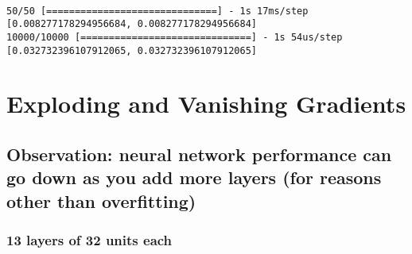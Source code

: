 \documentclass[11pt]{article}
\begin{document}
    \begin{center}
    \end{center}
    { \hspace*{\fill} \\}
    
    \begin{Verbatim}[commandchars=\\\{\}]
50/50 [==============================] - 1s 17ms/step
[0.008277178294956684, 0.008277178294956684]
10000/10000 [==============================] - 1s 54us/step
[0.032732396107912065, 0.032732396107912065]
    \end{Verbatim}

\newpage

    \hypertarget{exploding-and-vanishing-gradients}{%
\section{Exploding and Vanishing
Gradients}\label{exploding-and-vanishing-gradients}}

\hypertarget{observation-neural-network-performance-can-go-down-as-you-add-more-layers-for-reasons-other-than-overfitting}{%
\subsection{Observation: neural network performance can go down as you
add more layers (for reasons other than
overfitting)}\label{observation-neural-network-performance-can-go-down-as-you-add-more-layers-for-reasons-other-than-overfitting}}

\hypertarget{layers-of-32-units-each}{%
\subsubsection{13 layers of 32 units
each}\label{layers-of-32-units-each}}
\end{document}
